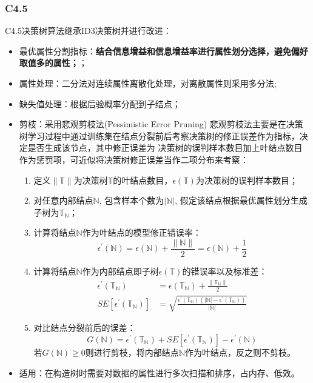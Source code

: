 \documentclass[a4paper]{article}
\begin{document}
		\subsubsection{C4.5}
		C4.5决策树算法继承ID3决策树并进行改进：
		\begin{itemize}
		    \item 	最优属性分割指标：\textbf{结合信息增益和信息增益率进行属性划分选择，避免偏好取值多的属性；}；
		    \item 	属性处理：二分法对连续属性离散化处理，对离散属性则采用多分法; 
		    \item 	缺失值处理：根据后验概率分配到子结点；
		    \item 	剪枝：采用悲观剪枝法(Pessimistic Error Pruning)
		    	悲观剪枝法主要是在决策树学习过程中通过训练集在结点分裂前后考察决策树的修正误差作为指标，决定是否生成该节点，其中修正误差为
		    	决策树的误判样本数目加上叶结点数目作为惩罚项，可近似将决策树修正误差当作二项分布来考察：
		    	\begin{enumerate}
		    		\item 	定义$\|\mathbb{T}\|$为决策树$\mathbb{T}$的叶结点数目，$\epsilon(\mathbb{T})$为决策树的误判样本数目；
					\item 	对任意内部结点$\mathbb{N}$, 包含样本个数为$|\mathbb{N}|$, 假定该结点根据最优属性划分生成子树为$\mathbb{T}_{\mathbb{N}}$；
					\item 	计算将结点$\mathbb{N}$作为叶结点的模型修正错误率：
							$$\epsilon^{'}(\mathbb{N}) = \epsilon(\mathbb{N}) +\frac{\|\mathbb{N}\|}{2}=\epsilon(\mathbb{N}) +\frac{1}{2}$$
					\item 	计算将结点$\mathbb{N}$作为内部结点即子树$\epsilon(\mathbb{T})$的错误率以及标准差：
							\begin{align*}
								\epsilon^{'}(\mathbb{T}_{\mathbb{N}}) 	&= \epsilon(\mathbb{T}_{\mathbb{N}}) +\frac{\|\mathbb{T}_{\mathbb{N}}\|}{2}\\
							SE[\epsilon^{'}(\mathbb{T}_{\mathbb{N}})]	&= \sqrt{\frac{\epsilon^{'}(\mathbb{T}_{\mathbb{N}})
											\left(|\mathbb{N}|-\epsilon^{'}\left(\mathbb{T}_{\mathbb{N}}\right)\right)}{|\mathbb{N}|}}
							\end{align*}
					\item 	对比结点分裂前后的误差：
							$$G(\mathbb{N}) = \epsilon^{'}(\mathbb{T}_{\mathbb{N}})+SE[\epsilon^{'}(\mathbb{T}_{\mathbb{N}})]-\epsilon^{'}(\mathbb{N})$$
							若$G(\mathbb{N})\geq0$则进行剪枝，将内部结点$\mathbb{N}$作为叶结点，反之则不剪枝。
				\end{enumerate} 
		    \item 适用：在构造树时需要对数据的属性进行多次扫描和排序，占内存、低效。
		  \end{itemize}
\end{document}
